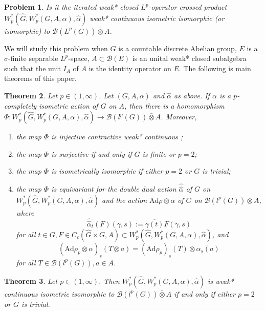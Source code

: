 \documentclass[reqno,11pt]{amsart}
\theoremstyle{plain}
\newtheorem{thm}{Theorem}[section]
\newtheorem{pro}[thm]{Problem}
\theoremstyle{definition}
\theoremstyle{remark}
\begin{document}
\begin{pro}
Is it the iterated weak* closed $L^p$-operator crossed product $W^*_p(\hat{G},W^*_p(G,A,\alpha),\hat{\alpha})$ weak* continuous isometric isomorphic (or isomorphic) to $\mathcal{B}(L^p(G))\bar{\otimes} A$.
\end{pro}

We will study this problem when $G$ is a countable discrete Abelian group, $E$ is a $\sigma$-finite separable $L^p$-space, $A\subset\mathcal{B}(E)$ is an unital weak* closed subalgebra such that the unit $I_A$ of $A$ is the identity operator on $E$. The following is main theorems of this paper.

\begin{thm}\label{Thm1}
Let $p\in (1,\infty)$. Let $(G,A,\alpha)$ and $\hat{\alpha}$ as above. If $\alpha$ is a $p$-completely isometric action of $G$ on $A$, then there is a homomorphism $\Phi:W^*_p(\hat{G},W^*_p(G,A,\alpha),\hat{\alpha})\rightarrow \mathcal{B}(l^p(G))\bar{\otimes} A$. Moreover,
\begin{enumerate}
\item[(i)] the map $\Phi$ is injective contractive weak* continuous ;
\item[(ii)] the map $\Phi$ is surjective if and only if $G$ is finite or $p=2$;
\item[(iii)] the map $\Phi$ is  isometrically  isomorphic if either $p=2$ or $G$ is trivial;
\item[(iv)] the map $\Phi$ is equivariant for the double dual action $\hat{\hat{\alpha}}$ of $G$ on $W^*_p(\hat{G},W^*_p(G,A,\alpha),\hat{\alpha})$ and the action $\mathrm{Ad}\rho\otimes\alpha$ of $G$ on $\mathcal{B}(l^p(G))\bar{\otimes}A$, where $$\hat{\hat{\alpha}}_{t}(F)(\gamma, s):=\overline{\gamma(t)} F(\gamma, s)$$ for all $t\in G, F\in C_c(\hat{G}\times G,A)\subset W^*_p(\hat{G},W^*_p(G,A,\alpha),\hat{\alpha})$, and
   $$(\mathrm{Ad}\rho_p\otimes\alpha)_s (T\otimes a)=(\mathrm{Ad}\rho_p)_s(T)\otimes \alpha_s(a)$$ for all $T\in \mathcal{B}(l^p(G)), a\in A$.
\end{enumerate}


\end{thm}

\begin{thm}\label{Thm2}
Let $p\in (1,\infty)$. Then $W^*_p(\hat{G},W^*_p(G,A,\alpha),\hat{\alpha})$ is weak* continuous isometric isomorphic to $\mathcal{B}(l^p(G))\bar{\otimes} A$ if and only if either $p=2$ or $G$ is trivial.
\end{thm}
\end{document}
